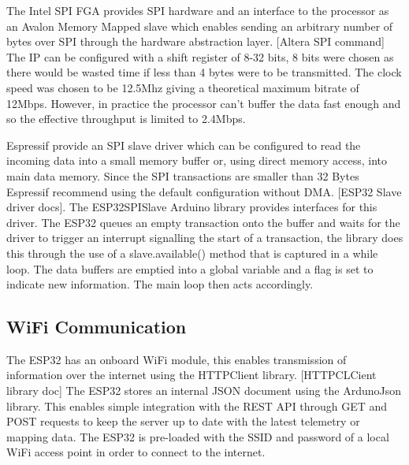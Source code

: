The Intel SPI FGA provides SPI hardware and an interface to the processor as an Avalon Memory Mapped slave which enables sending an arbitrary number of bytes over SPI through the hardware abstraction layer. [Altera SPI command] The IP can be configured with a shift register of 8-32 bits, 8 bits were chosen as there would be wasted time if less than 4 bytes were to be transmitted. The clock speed was chosen to be 12.5Mhz giving a theoretical maximum bitrate of 12Mbps. However, in practice the processor can’t buffer the data fast enough and so the effective throughput is limited to 2.4Mbps. 

Espressif provide an SPI slave driver which can be configured to read the incoming data into a small memory buffer or, using direct memory access, into main data memory. Since the SPI transactions are smaller than 32 Bytes Espressif recommend using the default configuration without DMA. [ESP32 Slave driver docs]. The ESP32SPISlave Arduino library provides interfaces for this driver. The ESP32 queues an empty transaction onto the buffer and waits for the driver to trigger an interrupt signalling the start of a transaction, the library does this through the use of a slave.available() method that is captured in a while loop. The data buffers are emptied into a global variable and a flag is set to indicate new information. The main loop then acts accordingly.

\subsection{WiFi Communication}

The ESP32 has an onboard WiFi module, this enables transmission of information over the internet using the HTTPClient library. [HTTPCLCient library doc] The ESP32 stores an internal JSON document using the ArdunoJson library. This enables simple integration with the REST API through GET and POST requests to keep the server up to date with the latest telemetry or mapping data. The ESP32 is pre-loaded with the SSID and password of a local WiFi access point in order to connect to the internet.


